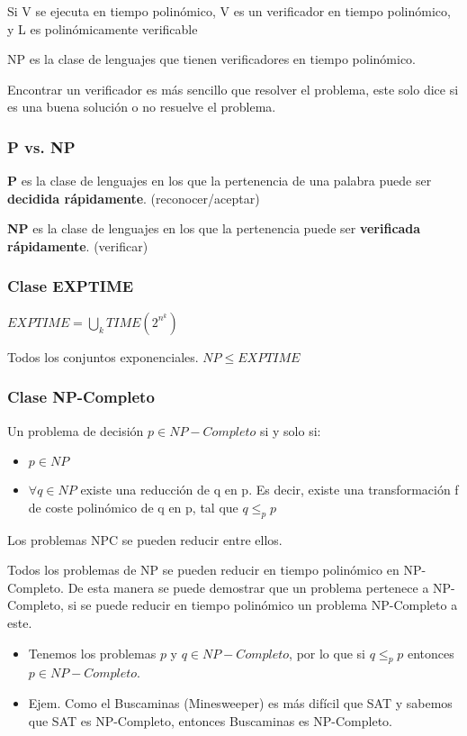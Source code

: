 Si V se ejecuta en tiempo polinómico, V es un verificador en tiempo polinómico, y L es polinómicamente verificable

NP es la clase de lenguajes que tienen verificadores en tiempo polinómico.

Encontrar un verificador es más sencillo que resolver el problema, este solo dice si es una buena solución o no resuelve el problema.

\subsubsection{P vs. NP}
\textbf{P} es la clase de lenguajes en los que la pertenencia de una palabra puede ser \textbf{decidida rápidamente}. (reconocer/aceptar)

\textbf{NP} es la clase de lenguajes en los que la pertenencia puede ser \textbf{verificada rápidamente}. (verificar)

\subsubsection{Clase EXPTIME}
$EXPTIME= \bigcup_k TIME(2^{n^k})$

Todos los conjuntos exponenciales. $NP \leq EXPTIME$

\subsubsection{Clase NP-Completo}
Un problema de decisión $p\in NP-Completo$ si y solo si:
\begin{itemize}
	\item $p \in NP$
	\item $\forall q \in NP$ existe una reducción de q en p. Es decir, existe una transformación f de coste polinómico de q en p, tal que $q \leq_p p$
\end{itemize}

Los problemas NPC se pueden reducir entre ellos.

Todos los problemas de NP se pueden reducir en tiempo polinómico en NP-Completo. De esta manera se puede demostrar que un problema pertenece a NP-Completo, si se puede reducir en tiempo polinómico un problema NP-Completo a este.
\begin{itemize}
	\item Tenemos los problemas $p$ y $ q\in NP-Completo$, por lo que si $q \leq_p p$ entonces $p \in NP-Completo$.
	\item Ejem. Como el Buscaminas (Minesweeper) es más difícil que SAT y sabemos que SAT es NP-Completo, entonces Buscaminas es NP-Completo.
\end{itemize}

